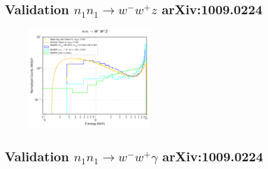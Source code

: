 \documentclass[epj,nopacs,fleqn]{svjour}
\begin{document}
\subsection{Validation $n_1 n_1 \rightarrow w^- w^+ z$  arXiv:1009.0224}

\begin{figure}[!h]
	\centering

	 \includegraphics[width=0.48\textwidth]{Fig/Ready/kinematic_wwz.pdf}
	\caption{}
	\label{n1n1z}
\end{figure}


\clearpage
\subsection{Validation $n_1 n_1 \rightarrow w^- w^+ \gamma$  arXiv:1009.0224}
\end{document}

